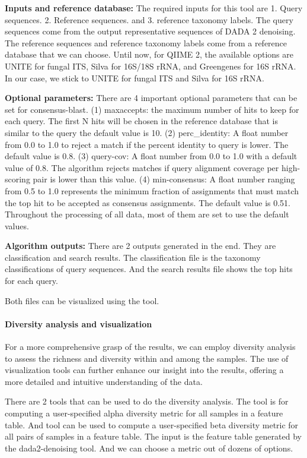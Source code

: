             \textbf{Inputs and reference database:}
            The required inputs for this tool are  1. Query sequences. 2. Reference sequences. and 3. reference taxonomy labels. The query sequences come from the output representative sequences of DADA 2 denoising. The reference sequences and reference taxonomy labels come from a reference database that we can choose. Until now, for QIIME 2, the available options are UNITE for fungal ITS, Silva for 16S/18S rRNA, and Greengenes for 16S rRNA. In our case, we stick to UNITE for fungal ITS and Silva for 16S rRNA.  

            \textbf{Optional parameters:}
            There are 4 important optional parameters that can be set for consensus-blast. (1) maxaccepts: the maximum number of hits to keep for each query. The first N hits will be chosen in the reference database that is similar to the query the default value is 10. (2) perc\_identity: A float number from 0.0 to 1.0 to reject a match if the percent identity to query is lower. The default value is 0.8. (3) query-cov: A float number from 0.0 to 1.0 with a default value of 0.8. The algorithm rejects matches if query alignment coverage per high-scoring pair is lower than this value. (4) min-consensus: A float number ranging from 0.5 to 1.0 represents the minimum fraction of assignments that must match the top hit to be accepted as consensus assignments. The default value is 0.51. Throughout the processing of all data, most of them are set to use the default values.

            \textbf{Algorithm outputs:}
            There are 2 outputs generated in the end. They are classification and search results. The classification file is the taxonomy classifications of query sequences. And the search results file shows the top hits for each query.

                Both files can be visualized using the  tool.


        \paragraph*{Diversity analysis and visualization}
            For a more comprehensive grasp of the results, we can employ diversity analysis to assess the richness and diversity within and among the samples. The use of visualization tools can further enhance our insight into the results, offering a more detailed and intuitive understanding of the data.

            There are 2 tools that can be used to do the diversity analysis. The tool  is for computing a user-specified alpha diversity metric for all samples in a feature table. And tool  can be used to compute a user-specified beta diversity metric for all pairs of samples in a feature table. The input is the feature table generated by the dada2-denoising tool. And we can choose a metric out of dozens of options.

